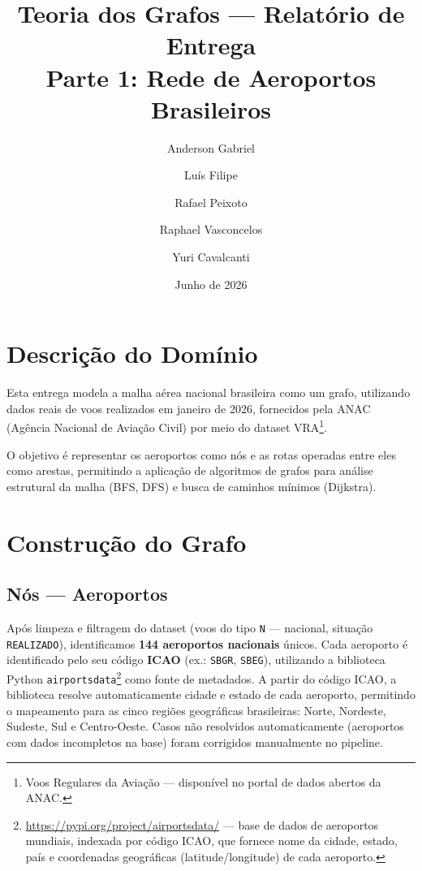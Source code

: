 \documentclass[12pt,a4paper]{article}
\title{
    \vspace{-1cm}
    \large Teoria dos Grafos --- Relatório de Entrega\\[0.4em]
    \LARGE \textbf{Parte 1: Rede de Aeroportos Brasileiros}
}
\author{Anderson Gabriel \and Luís Filipe \and Rafael Peixoto \and Raphael Vasconcelos \and Yuri Cavalcanti}
\date{Junho de 2026}
\begin{document}
\maketitle
\tableofcontents
\newpage

\section{Descrição do Domínio}

Esta entrega modela a malha aérea nacional brasileira como um grafo, utilizando dados reais de voos
realizados em janeiro de 2026, fornecidos pela ANAC (Agência Nacional de Aviação Civil) por meio do
dataset VRA\footnote{Voos Regulares da Aviação --- disponível no portal de dados abertos da ANAC.}.

O objetivo é representar os aeroportos como nós e as rotas operadas entre eles como arestas, permitindo
a aplicação de algoritmos de grafos para análise estrutural da malha (BFS, DFS) e busca de caminhos
mínimos (Dijkstra).

\section{Construção do Grafo}

\subsection{Nós --- Aeroportos}

Após limpeza e filtragem do dataset (voos do tipo \texttt{N} --- nacional, situação \texttt{REALIZADO}),
identificamos \textbf{144 aeroportos nacionais} únicos. Cada aeroporto é identificado pelo seu código
\textbf{ICAO} (ex.: \texttt{SBGR}, \texttt{SBEG}), utilizando a biblioteca Python
\texttt{airportsdata}\footnote{\url{https://pypi.org/project/airportsdata/} --- base de dados de
aeroportos mundiais, indexada por código ICAO, que fornece nome da cidade, estado, país e
coordenadas geográficas (latitude/longitude) de cada aeroporto.} como fonte de metadados.
A partir do código ICAO, a biblioteca resolve automaticamente cidade e estado de cada aeroporto,
permitindo o mapeamento para as cinco regiões geográficas brasileiras: Norte, Nordeste, Sudeste,
Sul e Centro-Oeste. Casos não resolvidos automaticamente (aeroportos com dados incompletos na
base) foram corrigidos manualmente no pipeline.
\end{document}

